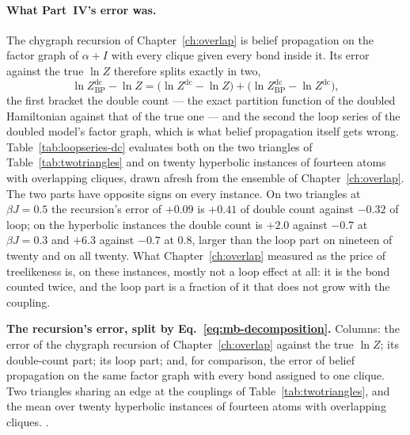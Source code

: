 \paragraph{What Part~IV's error was.} The chygraph recursion of
Chapter~\ref{ch:overlap} is belief propagation on the factor graph of
$\alpha+I$ with every clique given every bond inside it. Its error against
the true $\ln Z$ therefore splits exactly in two,
\begin{equation}
  \ln Z^{\mathrm{dc}}_{\mathrm{BP}}-\ln Z
  =\bigl(\ln Z^{\mathrm{dc}}-\ln Z\bigr)
  +\bigl(\ln Z^{\mathrm{dc}}_{\mathrm{BP}}-\ln Z^{\mathrm{dc}}\bigr),
  \label{eq:mb-decomposition}
\end{equation}
the first bracket the double count --- the exact partition function of the
doubled Hamiltonian against that of the true one --- and the second the
loop series of the doubled model's factor graph, which is what belief
propagation itself gets wrong. Table~\ref{tab:loopseries-dc} evaluates both
on the two triangles of Table~\ref{tab:twotriangles} and on twenty
hyperbolic instances of fourteen atoms with overlapping cliques, drawn
afresh from the ensemble of Chapter~\ref{ch:overlap}. The two parts have
opposite signs on every instance. On two triangles at $\beta J=0.5$ the
recursion's error of $+0.09$ is $+0.41$ of double count against $-0.32$ of
loop; on the hyperbolic instances the double count is $+2.0$ against
$-0.7$ at $\beta J=0.3$ and $+6.3$ against $-0.7$ at $0.8$, larger than the
loop part on nineteen of twenty and on all twenty. What
Chapter~\ref{ch:overlap} measured as the price of treelikeness is, on
these instances, mostly not a loop effect at all: it is the bond counted
twice, and the loop part is a fraction of it that does not grow with the
coupling.

\begin{table}[tb]
\centering\small
\begin{adjustbox}{max width=\linewidth}

\end{adjustbox}
\caption{\textbf{The recursion's error, split by
Eq.~\eqref{eq:mb-decomposition}.} Columns: the error of the chygraph
recursion of Chapter~\ref{ch:overlap} against the true $\ln Z$; its
double-count part; its loop part; and, for comparison, the error of belief
propagation on the same factor graph with every bond assigned to one
clique. Two triangles sharing an edge at the couplings of
Table~\ref{tab:twotriangles}, and the mean over twenty hyperbolic
instances of fourteen atoms with overlapping cliques.
.}
\label{tab:loopseries-dc}
\end{table}

